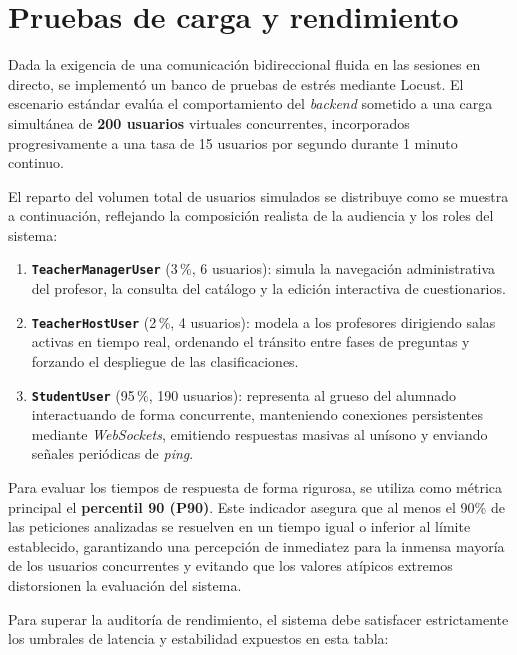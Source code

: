 \section{Pruebas de carga y rendimiento}\label{sec:pruebas_rendimiento_carga}

Dada la exigencia de una comunicación bidireccional fluida en las sesiones en directo, se implementó un banco de pruebas de estrés mediante Locust. El escenario estándar evalúa el comportamiento del \textit{backend} sometido a una carga simultánea de \textbf{200 usuarios} virtuales concurrentes, incorporados progresivamente a una tasa de 15 usuarios por segundo durante 1 minuto continuo.

El reparto del volumen total de usuarios simulados se distribuye como se muestra a continuación, reflejando la composición realista de la audiencia y los roles del sistema:

\begin{enumerate}
    \item \textbf{\texttt{TeacherManagerUser}} (3\,\%, 6 usuarios): simula la navegación administrativa del profesor, la consulta del catálogo y la edición interactiva de cuestionarios.
    \item \textbf{\texttt{TeacherHostUser}} (2\,\%, 4 usuarios): modela a los profesores dirigiendo salas activas en tiempo real, ordenando el tránsito entre fases de preguntas y forzando el despliegue de las clasificaciones.
    \item \textbf{\texttt{StudentUser}} (95\,\%, 190 usuarios): representa al grueso del alumnado interactuando de forma concurrente, manteniendo conexiones persistentes mediante \textit{WebSockets}, emitiendo respuestas masivas al unísono y enviando señales periódicas de \textit{ping}.
\end{enumerate}

Para evaluar los tiempos de respuesta de forma rigurosa, se utiliza como métrica principal el \textbf{percentil 90 (P90)}. Este indicador asegura que al menos el 90\% de las peticiones analizadas se resuelven en un tiempo igual o inferior al límite establecido, garantizando una percepción de inmediatez para la inmensa mayoría de los usuarios concurrentes y evitando que los valores atípicos extremos distorsionen la evaluación del sistema.

Para superar la auditoría de rendimiento, el sistema debe satisfacer estrictamente los umbrales de latencia y estabilidad expuestos en esta tabla:

